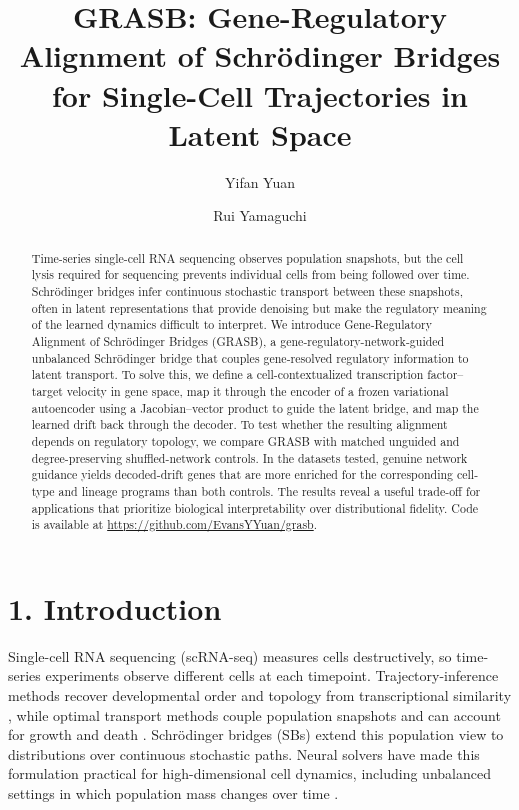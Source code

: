 \documentclass[
  11pt,
  letterpaper,
]{article}
\title{GRASB: Gene-Regulatory Alignment of Schrödinger Bridges for Single-Cell Trajectories in Latent Space}
\author[1,2]{Yifan Yuan}
\author[1,2]{Rui Yamaguchi}
\affil[1]{Division of Cancer Systems Biology, Aichi Cancer Center Research Institute}
\affil[2]{Cancer Informatics, Graduate School of Medicine, Nagoya University}
\date{}
\begin{document}
\maketitle
\begin{NoHyper}
\begingroup
\renewcommand{\thefootnote}{}
\endgroup
\end{NoHyper}
\begin{abstract}
Time-series single-cell RNA sequencing observes population snapshots,
but the cell lysis required for sequencing prevents individual cells
from being followed over time. Schrödinger bridges infer continuous
stochastic transport between these snapshots, often in latent
representations that provide denoising but make the regulatory meaning
of the learned dynamics difficult to interpret. We introduce
Gene-Regulatory Alignment of Schrödinger Bridges (GRASB), a
gene-regulatory-network-guided unbalanced Schrödinger bridge that couples
gene-resolved regulatory information to latent transport. To solve this,
we define a cell-contextualized transcription factor--target
velocity in gene space, map it through the encoder of a frozen
variational autoencoder using a Jacobian--vector product to guide the
latent bridge, and map the learned drift back through the decoder.
To test whether the resulting alignment depends on regulatory topology,
we compare GRASB with matched unguided and degree-preserving
shuffled-network controls. In the datasets tested, genuine network
guidance yields decoded-drift genes that are more enriched for the
corresponding cell-type and lineage programs than both controls. The
results reveal a useful trade-off for applications that prioritize
biological interpretability over distributional fidelity. Code is available at
\url{https://github.com/EvansYYuan/grasb}.
\end{abstract}

\section{1. Introduction}\label{introduction}

Single-cell RNA sequencing (scRNA-seq) measures cells destructively, so
time-series experiments observe different cells at each timepoint.
Trajectory-inference methods recover developmental order and topology
from transcriptional similarity \parencite{saelens_comparison_2019}, while optimal
transport methods couple population snapshots and can account for growth
and death \parencite{schiebinger_optimal-transport_2019}. Schrödinger bridges (SBs) extend
this population view to distributions over continuous stochastic paths.
Neural solvers have made this formulation practical for high-dimensional
cell dynamics, including unbalanced settings in which population mass
changes over time \parencite{de_bortoli_diffusion_2021,pariset_unbalanced_2023,
alatkar_artemis_2025,zhang_modeling_2025}.
\end{document}
